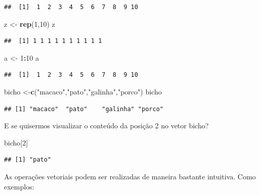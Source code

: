 \documentclass[
]{book}
\newenvironment{Shaded}{\begin{snugshade}}{\end{snugshade}}
\newcommand{\DecValTok}[1]{\textcolor[rgb]{0.00,0.00,0.81}{#1}}
\newcommand{\KeywordTok}[1]{\textcolor[rgb]{0.13,0.29,0.53}{\textbf{#1}}}
\newcommand{\NormalTok}[1]{#1}
\newcommand{\OperatorTok}[1]{\textcolor[rgb]{0.81,0.36,0.00}{\textbf{#1}}}
\newcommand{\StringTok}[1]{\textcolor[rgb]{0.31,0.60,0.02}{#1}}
\begin{document}
\begin{verbatim}
##  [1]  1  2  3  4  5  6  7  8  9 10
\end{verbatim}

\begin{Shaded}
\begin{Highlighting}[]
\NormalTok{z <-}\StringTok{ }\KeywordTok{rep}\NormalTok{(}\DecValTok{1}\NormalTok{,}\DecValTok{10}\NormalTok{)}
\NormalTok{z}
\end{Highlighting}
\end{Shaded}

\begin{verbatim}
##  [1] 1 1 1 1 1 1 1 1 1 1
\end{verbatim}

\begin{Shaded}
\begin{Highlighting}[]
\NormalTok{a <-}\StringTok{ }\DecValTok{1}\OperatorTok{:}\DecValTok{10}
\NormalTok{a}
\end{Highlighting}
\end{Shaded}

\begin{verbatim}
##  [1]  1  2  3  4  5  6  7  8  9 10
\end{verbatim}

\begin{Shaded}
\begin{Highlighting}[]
\NormalTok{bicho <-}\KeywordTok{c}\NormalTok{(}\StringTok{"macaco"}\NormalTok{,}\StringTok{"pato"}\NormalTok{,}\StringTok{"galinha"}\NormalTok{,}\StringTok{"porco"}\NormalTok{)}
\NormalTok{bicho}
\end{Highlighting}
\end{Shaded}

\begin{verbatim}
## [1] "macaco"  "pato"    "galinha" "porco"
\end{verbatim}

E se quisermos visualizar o conteúdo da posição 2 no vetor bicho?

\begin{Shaded}
\begin{Highlighting}[]
\NormalTok{bicho[}\DecValTok{2}\NormalTok{]}
\end{Highlighting}
\end{Shaded}

\begin{verbatim}
## [1] "pato"
\end{verbatim}

As operações vetoriais podem ser realizadas de maneira bastante intuitiva. Como exemplos:
\end{document}
